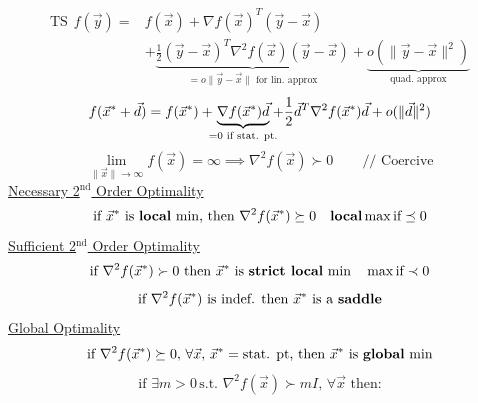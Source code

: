 \documentclass[twocolumn,12pt]{article}    %
\newcommand \hfive {\hspace{5pt}}
\begin{document}
\begin{align*}
    \text{TS} \hfive f(\vec{y}) = &f(\vec{x}) + \nabla f(\vec{x})^T(\vec{y}-\vec{x}) \\
    &+ \underbrace{\frac{1}{2} (\vec{y}-\vec{x})^T \nabla^2 f(\Vec{x}) (\vec{y}-\vec{x})}_{=o\|\vec{y}-\vec{x}\| \text{ for lin. approx}} + \underbrace{o\left( \|\vec{y} -\vec{x}\| ^2 \right)}_{\text{quad. approx}}
\end{align*}
\begin{equation*}
    f(\vec{x}^* + \vec{d}) = f(\vec{x}^*) + \hspace{-5pt}
    \underbrace{\nabla f(\vec{x}^*)\vec{d}}_{= 0 \text{ if stat. pt.}} \hspace{-5pt} + \frac{1}{2}\vec{d}^T\nabla^2f(\vec{x}^*) \vec{d} + o (\|\vec{d}\|^2 )
\end{equation*}
\begin{equation*}
    \lim_{\|\vec{x}\| \to \infty} f(\vec{x}) =\infty \implies \nabla^2f(\vec{x}) \succ 0 \hspace{25pt} \text{// Coercive} 
\end{equation*}
\noindent \underline{Necessary 2\(^{\text{nd}}\) Order Optimality}
\begin{equation*}
    \text{if } \vec{x}^* \text{ is \textbf{local} min, then } \nabla^2f(\vec{x}^*) \succeq 0 \hspace{10pt} \textbf{local} \max \text{if} \preceq 0
\end{equation*}
\noindent \underline{Sufficient 2\(^{\text{nd}}\) Order Optimality}
\begin{equation*}
    \text{if } \nabla^2 f(\vec{x}^*) \succ 0 \text{ then } \vec{x}^* \text{ is \textbf{strict local} min} \hspace{10pt} \max \text{if} \prec 0
\end{equation*}
\begin{equation*}
    \text{if } \nabla^2 f(\vec{x}^*) \text{ is indef. then } \vec{x}^* \text{ is a \textbf{saddle}}
\end{equation*}
\noindent\underline{Global Optimality}
\begin{equation*}
    \text{if } \nabla^2f(\vec{x}^*) \succeq 0,\, \forall \vec{x},\,\vec{x}^*= \text{stat. pt, then } \vec{x}^* \text{ is \textbf{global} min} 
\end{equation*}
\begin{equation*}
    \text{if } \exists m>0 \, \text{s.t. } \nabla^2 f(\vec{x}) \succ mI, \, \forall \vec{x} \text{ then:} 
\end{equation*}
\end{document}

